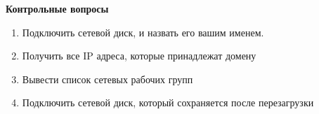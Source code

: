 \documentclass[a4paper,12pt]{article}
\begin{document}
\begin{flushleft}
\begin{enumerate} [1. ]
\begin{enumerate} [\bf a. ]
        \end{enumerate}
    \end{enumerate}

  \end{flushleft}

  \begin{center}
   {\bf Контрольные вопросы}
  \end{center}
  \begin{flushleft}
    \begin{enumerate}
     \item Подключить сетевой диск, и назвать его вашим именем.
     \item Получить все IP адреса, которые принадлежат домену 
     \item Вывести список сетевых рабочих групп
     \item Подключить сетевой диск, который сохраняется после перезагрузки
      
    \end{enumerate}

  \end{flushleft}
\end{document}
